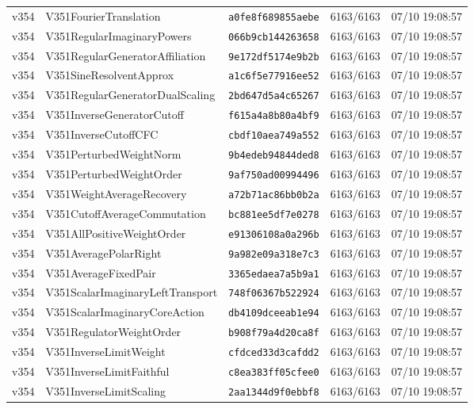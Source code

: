 \documentclass[11pt]{article}
\theoremstyle{definition}\newtheorem{deriv}{Derivação}
\begin{document}
{\begin{longtable}{@{}lllll@{}}
v354 & V351FourierTranslation & \texttt{a0fe8f689855aebe} & 6163/6163 & 07/10 19:08:57 \\
v354 & V351RegularImaginaryPowers & \texttt{066b9cb144263658} & 6163/6163 & 07/10 19:08:57 \\
v354 & V351RegularGeneratorAffiliation & \texttt{9e172df5174e9b2b} & 6163/6163 & 07/10 19:08:57 \\
v354 & V351SineResolventApprox & \texttt{a1c6f5e77916ee52} & 6163/6163 & 07/10 19:08:57 \\
v354 & V351RegularGeneratorDualScaling & \texttt{2bd647d5a4c65267} & 6163/6163 & 07/10 19:08:57 \\
v354 & V351InverseGeneratorCutoff & \texttt{f615a4a8b80a4bf9} & 6163/6163 & 07/10 19:08:57 \\
v354 & V351InverseCutoffCFC & \texttt{cbdf10aea749a552} & 6163/6163 & 07/10 19:08:57 \\
v354 & V351PerturbedWeightNorm & \texttt{9b4edeb94844ded8} & 6163/6163 & 07/10 19:08:57 \\
v354 & V351PerturbedWeightOrder & \texttt{9af750ad00994496} & 6163/6163 & 07/10 19:08:57 \\
v354 & V351WeightAverageRecovery & \texttt{a72b71ac86bb0b2a} & 6163/6163 & 07/10 19:08:57 \\
v354 & V351CutoffAverageCommutation & \texttt{bc881ee5df7e0278} & 6163/6163 & 07/10 19:08:57 \\
v354 & V351AllPositiveWeightOrder & \texttt{e91306108a0a296b} & 6163/6163 & 07/10 19:08:57 \\
v354 & V351AveragePolarRight & \texttt{9a982e09a318e7c3} & 6163/6163 & 07/10 19:08:57 \\
v354 & V351AverageFixedPair & \texttt{3365edaea7a5b9a1} & 6163/6163 & 07/10 19:08:57 \\
v354 & V351ScalarImaginaryLeftTransport & \texttt{748f06367b522924} & 6163/6163 & 07/10 19:08:57 \\
v354 & V351ScalarImaginaryCoreAction & \texttt{db4109dceeab1e94} & 6163/6163 & 07/10 19:08:57 \\
v354 & V351RegulatorWeightOrder & \texttt{b908f79a4d20ca8f} & 6163/6163 & 07/10 19:08:57 \\
v354 & V351InverseLimitWeight & \texttt{cfdced33d3cafdd2} & 6163/6163 & 07/10 19:08:57 \\
v354 & V351InverseLimitFaithful & \texttt{c8ea383ff05cfee0} & 6163/6163 & 07/10 19:08:57 \\
v354 & V351InverseLimitScaling & \texttt{2aa1344d9f0ebbf8} & 6163/6163 & 07/10 19:08:57 \\

\end{longtable}}
\end{document}
